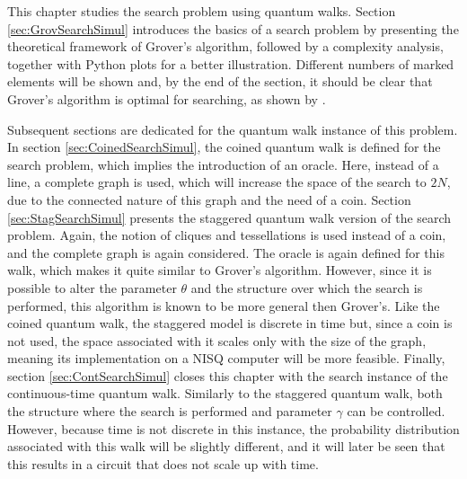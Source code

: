 \documentclass[../../dissertation.tex]{subfiles}
\begin{document}
This chapter studies the search problem using quantum walks.
Section \ref{sec:GrovSearchSimul} introduces the basics of a search problem by
presenting the theoretical framework of Grover's algorithm, followed by a
complexity analysis, together with Python plots for a better illustration.
Different numbers of marked elements will be shown and, by the end of the
section, it should be clear that Grover's algorithm is optimal for searching,
as shown by \cite{zalka1999}.\par

Subsequent sections are dedicated for the quantum walk instance of this
problem. In section \ref{sec:CoinedSearchSimul}, the coined quantum walk is
defined for the search problem, which implies the introduction of an oracle.
Here, instead of a line, a complete graph is used, which will increase the
space of the search to $2N$, due to the connected nature of this graph and the
need of a coin. Section \ref{sec:StagSearchSimul} presents the staggered
quantum walk version of the search problem. Again, the notion of cliques and
tessellations is used instead of a coin, and the complete graph is again
considered. The oracle is again defined for this walk, which makes it quite
similar to Grover's algorithm. However, since it is possible to alter the
parameter $\theta$ and the structure over which the search is performed, this
algorithm is known to be more general then Grover's. Like the coined quantum
walk, the staggered model is discrete in time but, since a coin is not used,
the space associated with it scales only with the size of the graph, meaning
its implementation on a NISQ computer will be more feasible. Finally, section
\ref{sec:ContSearchSimul} closes this chapter with the search instance of the
continuous-time quantum walk. Similarly to the staggered quantum walk, both the
structure where the search is performed and parameter $\gamma$ can be
controlled. However, because time is not discrete in this instance, the
probability distribution associated with this walk will be slightly different,
and it will later be seen that this results in a circuit that does not scale up
with time.  
\end{document}

